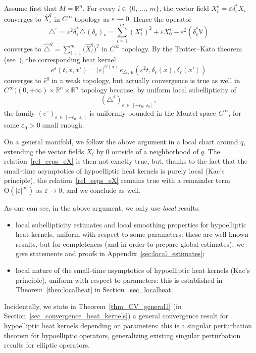 \documentclass[10pt]{amsart}
\theoremstyle{definition}\newtheorem{defi}[theo]{Definition}\newtheorem{rema}[theo]{Remark}\newtheorem{exam}[theo]{Example}\newtheorem{exem}[theo]{Example}\newtheorem{nota}[theo]{Notation}
\newcommand*\R{\mathbb{R}}
\newcommand{\bbV}{\mathbb{V}}
\newcommand{\calQ}{\mathcal{Q}}
\newcommand{\rmO}{\mathrm{O}}
\begin{document}
Assume first that $M=\R^n$. For every $i\in\{0,\,\ldots,\,m\}$, the vector field $X_i^\varepsilon = \varepsilon\delta_\varepsilon^*X_i$ converges to $\widehat{X}^q_i$ in $C^\infty$ topology as $\varepsilon\rightarrow 0$. Hence the operator
\[
\triangle^\varepsilon = \varepsilon^2\delta_\varepsilon^*\triangle(\delta_\varepsilon)_* = \sum_{i=1}^m \left(X^\varepsilon_i \right)^2 + \varepsilon X^\varepsilon_0 - \varepsilon^2 \left(\delta_\varepsilon^*\bbV\right)
\]
converges to $\widehat{\triangle}^{q} = \sum_{i=1}^m \big(\widehat{X}^q_i\big)^2$ in $C^\infty$ topology. By the Trotter--Kato theorem (see~\cite{EngelNagel,Pazy}), the corresponding heat kernel
\begin{equation}\label{rel_eeps_eX}
e^\varepsilon (t,x,x') = \vert\varepsilon\vert^{\calQ(q)}\, e_{\triangle,\,\mu}\left(\varepsilon^2 t,\delta_\varepsilon(x),\delta_\varepsilon(x')\right)
\end{equation}
converges to $\widehat{e}^{q}$ in a weak topology, but actually convergence is true as well in $C^\infty((0,+\infty)\times\R^n\times\R^n$ topology because, by uniform local subellipticity of \[
(\triangle^\varepsilon)_{\varepsilon\,\in\,[-\varepsilon_0,\,\varepsilon_0]},
\]
the family $(e^\varepsilon)_{\varepsilon\,\in\,[-\varepsilon_0,\,\varepsilon_0]}$ is uniformly bounded in the Montel space $C^\infty$, for some $\varepsilon_0>0$ small enough.

On a general manifold, we follow the above argument in a local chart around $q$, extending the vector fields $X_i$ by $0$ outside of a neighborhood of $q$. The relation~\eqref{rel_eeps_eX} is then not exactly true, but, thanks to the fact that the small-time asymptotics of hypoelliptic heat kernels is purely local (Kac's principle), the relation~\eqref{rel_eeps_eX} remains true with a remainder term $\rmO(\vert\varepsilon\vert^\infty)$ as $\varepsilon\rightarrow 0$, and we conclude as well.


As one can see, in the above argument, we only use \emph{local} results:
\begin{itemize}
\item local subellipticity estimates and local smoothing properties for hypoelliptic heat kernels, uniform with respect to some parameters: these are well known results, but for completeness (and in order to prepare global estimates), we give statements and proofs in Appendix~\ref{sec:local_estimates};
\item local nature of the small-time asymptotics of hypoelliptic heat kernels (Kac's principle), uniform with respect to parameters: this is established in Theorem~\ref{theo:localheat} in Section~\ref{sec_localheat}.
\end{itemize}
Incidentally, we state in Theorem~\ref{thm_CV_general1} (in Section~\ref{sec_convergence_heat_kernels}) a general convergence result for hypoelliptic heat kernels depending on parameters: this is a singular perturbation theorem for hypoelliptic operators, generalizing existing singular perturbation results for elliptic operators.
\end{document}
